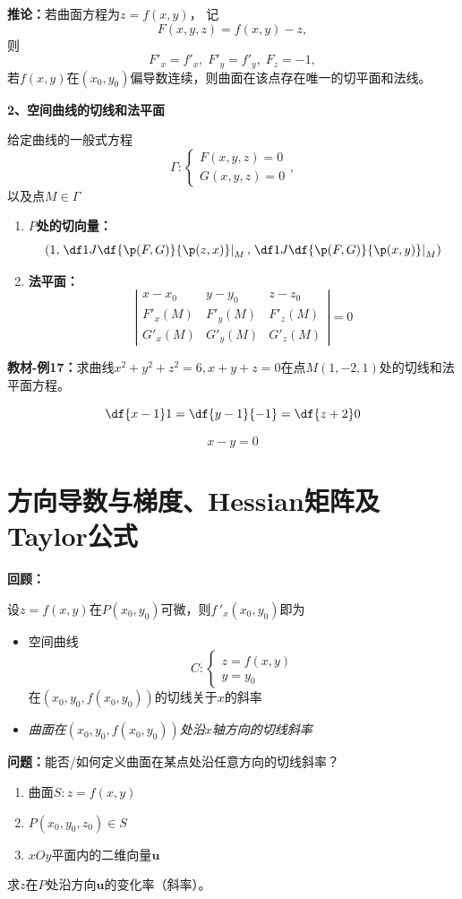 {\bf 推论：}若曲面方程为$z=f(x,y)$， 记
$$F(x,y,z)=f(x,y)-z,$$
则
$$F'_x=f'_x,\;F'_y=f'_y,\;F_z=-1,$$
若$f(x,y)$在$(x_0,y_0)$偏导数连续，则曲面在该点存在唯一的切平面和法线。

{\bf 2、空间曲线的切线和法平面}

给定曲线的一般式方程
$$\Gamma: \left\{\begin{array}{l}
	F(x,y,z)=0\\ G(x,y,z)=0
\end{array}\right.,$$
以及点$M\in\Gamma$

\begin{enumerate}[(1)]
  \setlength{\itemindent}{1cm}
  \item {\bf $P$处的切向量：} 
  $$\left(1,\left.\df 1J\df{\p(F,G)}{\p(z,x)}\right|_M,
  \left.\df 1J\df{\p(F,G)}{\p(x,y)}\right|_M\right)$$
  \item {\bf 法平面：}
  $$\left|
  		\begin{array}{ccc}
  			x-x_0 & y-y_0 & z-z_0\\
  			F'_x(M) & F'_y(M) & F'_z(M)\\
  			G'_x(M) & G'_y(M) & G'_z(M)
  		\end{array}
  	\right|=0$$
\end{enumerate}

{\bf 教材-例17：}求曲线$x^2+y^2+z^2=6,x+y+z=0$在点$M(1,-2,1)$处的切线和法平面方程。

$$\df{x-1}1=\df{y-1}{-1}=\df{z+2}0$$

$$x-y=0$$

\section{方向导数与梯度、Hessian矩阵及Taylor公式}

{\bf 回顾：}

设$z=f(x,y)$在$P(x_0,y_0)$可微，则$f\,'_x(x_0,y_0)$即为
\begin{itemize}
  \item 空间曲线
  $$C:\left\{\begin{array}{l}
  	z=f(x,y)\\ y=y_0
  \end{array}\right.$$
  在$(x_0,y_0,f(x_0,y_0))$的切线关于$x$的斜率
  \item {\it 曲面在$(x_0,y_0,f(x_0,y_0))$处沿$x$轴方向的切线斜率}
\end{itemize}

{\bf 问题：}能否/如何定义曲面在某点处沿任意方向的切线斜率？

\begin{enumerate}[(1)]
  \setlength{\itemindent}{1cm}
  \item 曲面$S:z=f(x,y)$ 
  \item $P(x_0,y_0,z_0)\in S$ 
  \item $xOy$平面内的二维向量$\bm{u}$ 
\end{enumerate}
求$z$在$P$处沿方向$\bm{u}$的变化率（斜率）。

